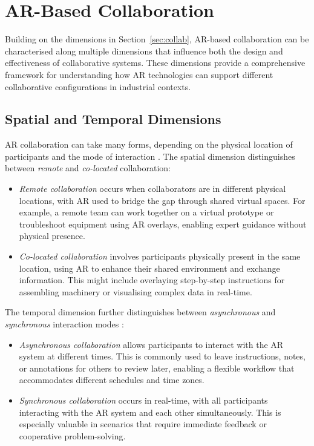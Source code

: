 \section{AR-Based Collaboration}\label{sec:ar_collab}
Building on the dimensions in Section~\ref{sec:collab}, AR-based collaboration can be characterised along multiple dimensions that influence both the design and effectiveness of collaborative systems. These dimensions provide a comprehensive framework for understanding how AR technologies can support different collaborative configurations in industrial contexts.

\subsection{Spatial and Temporal Dimensions}
AR collaboration can take many forms, depending on the physical location of participants and the mode of interaction \cite{feng2023comprehensive}. The spatial dimension distinguishes between \textit{remote} and \textit{co-located} collaboration:

\begin{itemize}
    \item \textit{Remote collaboration} occurs when collaborators are in different physical locations, with AR used to bridge the gap through shared virtual spaces. For example, a remote team can work together on a virtual prototype or troubleshoot equipment using AR overlays, enabling expert guidance without physical presence.
    \item \textit{Co-located collaboration} involves participants physically present in the same location, using AR to enhance their shared environment and exchange information. This might include overlaying step-by-step instructions for assembling machinery or visualising complex data in real-time.
\end{itemize}

The temporal dimension further distinguishes between \textit{asynchronous} and \textit{synchronous} interaction modes \cite{feng2023comprehensive}:

\begin{itemize}
    \item \textit{Asynchronous collaboration} allows participants to interact with the AR system at different times. This is commonly used to leave instructions, notes, or annotations for others to review later, enabling a flexible workflow that accommodates different schedules and time zones.
    \item \textit{Synchronous collaboration} occurs in real-time, with all participants interacting with the AR system and each other simultaneously. This is especially valuable in scenarios that require immediate feedback or cooperative problem-solving.
\end{itemize}

